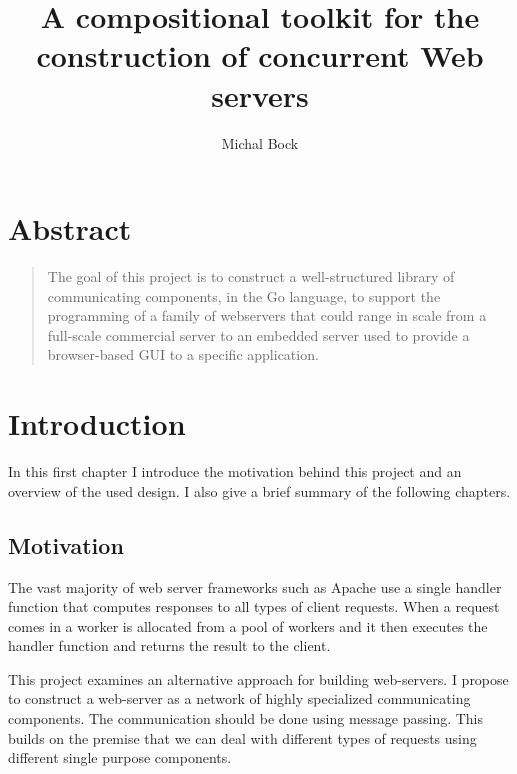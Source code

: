 \documentclass[12pt,a4paper]{article}
\title{A compositional toolkit for the construction of concurrent Web servers}
\author{Michal Bock}
\date{}
\begin{document}
\maketitle
\thispagestyle{empty}


\newpage
\section*{Abstract}
\begin{quote}
The goal of this project is to construct a well-structured
library of communicating components, in the Go language, to support
the programming of a family of webservers that could range in scale 
from a full-scale commercial server to an embedded server used to provide 
a browser-based GUI to a specific application.
\end{quote}

\newpage
{}
\tableofcontents

\newpage
\section{Introduction}
In this first chapter I introduce the motivation behind this project and 
an overview of the used design. I also give a brief summary of the following
chapters. 

\subsection{Motivation}
The vast majority of web server frameworks such as Apache
use a single handler function that
computes responses to all types of client requests. When a request comes in a 
worker is allocated from a pool of workers and it then executes the handler function
and returns the result to the client.

This project examines an alternative approach for building web-servers. 
I propose to construct a web-server as a network of highly specialized 
communicating components. The communication should be done using
message passing. This builds on the premise that we can deal
with different types of requests using different single purpose components.
\end{document}
